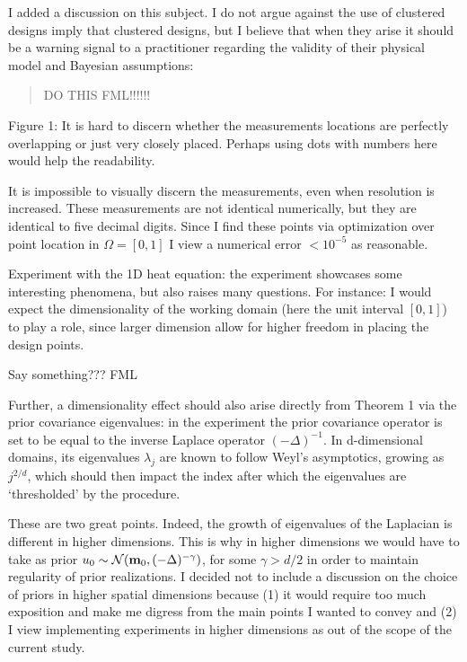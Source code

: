 \AR I added a discussion on this subject. I do not argue against the
use of clustered designs imply that clustered designs, but I believe
that when they arise it should be a warning signal to a practitioner
regarding the validity of their physical model and Bayesian
assumptions:

\begin{quote}
  DO THIS FML!!!!!!
\end{quote}

\RC Figure 1: It is hard to discern whether the measurements locations
are perfectly overlapping or just very closely placed. Perhaps using
dots with numbers here would help the readability.
  
\AR It is impossible to visually discern the measurements, even when
resolution is increased. These measurements are not identical
numerically, but they are identical to five decimal digits. Since I
find these points via optimization over point location in
$\Omega=[0,1]$ I view a numerical error $<10^{-5}$ as reasonable.


\RC Experiment with the 1D heat equation: the experiment showcases
some interesting phenomena, but also raises many questions. For
instance: I would expect the dimensionality of the working domain
(here the unit interval $[0, 1]$) to play a role, since larger
dimension allow for higher freedom in placing the design points.

\AR Say something??? FML

\RC Further, a dimensionality effect should also arise directly from
Theorem 1 via the prior covariance eigenvalues: in the experiment the
prior covariance operator is set to be equal to the inverse Laplace
operator $(-\Delta)^{-1}$. In d-dimensional domains, its eigenvalues
$\lambda_j$ are known to follow Weyl’s asymptotics, growing as
$j^{2/d}$, which should then impact the index after which the
eigenvalues are ‘thresholded’ by the procedure.

\AR These are two great points. Indeed, the growth of eigenvalues of
the Laplacian is different in higher dimensions. This is why in higher
dimensions we would have to take as prior \(u_0 \sim
\mathcal{N}(\mathbf{m}_0, (-\Delta)^{-\gamma})\), for some \(\gamma >
d/2\) in order to maintain regularity of prior realizations. I decided
not to include a discussion on the choice of priors in higher spatial
dimensions because (1) it would require too much exposition and make
me digress from the main points I wanted to convey and (2) I view
implementing experiments in higher dimensions as out of the scope of
the current study.


